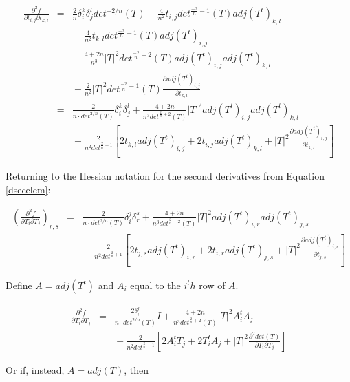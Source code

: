 \documentclass{report}
\begin{document}
\begin{eqnarray}
\nonumber
\frac{\partial^2 f}{\partial t_{i,j} \partial t_{k,l}} & = &
\frac{2}{n} \delta_i^k \delta_j^l det^{-2/n}(T) 
  - \frac{4}{n^2} t_{i,j} det^{\frac{-2}{n}-1}(T) adj(T^t)_{k,l} \\
\nonumber
  & & {} - \frac{4}{n^2}t_{k,l} det^{\frac{-2}{n} - 1}(T) adj(T^t)_{i,j} \\
\nonumber
  & & {} + \frac{4+2n}{n^3} |T|^2 det^{\frac{-2}{n} - 2}(T) adj(T^t)_{i,j} adj(T^t)_{k,l} \\
  & & {} - \frac{2}{n^2} |T|^2 det^{\frac{-2}{n} - 1}(T) \frac{\partial adj(T^t)_{i,j}}{\partial t_{k,l}} \\
 & = & \frac{2}{n \cdot det^{2/n}(T)} \delta_i^k \delta_j^l
     + \frac{4 + 2n}{n^3 det^{\frac{2}{n}+2}(T)} |T|^2 adj(T^t)_{i,j} adj(T^t)_{k,l} \\
\nonumber
& & {} - \frac{2}{n^2 det^{\frac{2}{n}+1}} \left[ 
     2 t_{k,l} adj(T^t)_{i,j} + 2 t_{i,j} adj(T^t)_{k,l}
     + |T|^2 \frac{\partial adj(T^t)_{i,j}}{\partial t_{k,l}} \right] 
\end{eqnarray}

\noindent Returning to the Hessian notation for the second derivatives from Equation \ref{dsecelem}:


\begin{eqnarray}
\left(\frac{\partial^2 f}{\partial T_i \partial T_j}\right)_{r,s} &=&
\frac{2}{n \cdot det^{2/n}(T)} \delta_i^j \delta_r^s
     + \frac{4 + 2n}{n^3 det^{\frac{2}{n}+2}(T)} |T|^2 adj(T^t)_{i,r} adj(T^t)_{j,s} \\
\nonumber
& & {} - \frac{2}{n^2 det^{\frac{2}{n}+1}} \left[ 
     2 t_{j,s} adj(T^t)_{i,r} + 2 t_{i,r} adj(T^t)_{j,s}
     + |T|^2 \frac{\partial adj(T^t)_{i,r}}{\partial t_{j,s}} \right] 
\end{eqnarray}

\noindent Define $A = adj(T^t)$ and $A_i$ equal to the $i^th$ row of $A$.

\begin{eqnarray}
\frac{\partial^2 f}{\partial T_i \partial T_j}
&=& \frac{2 \delta_i^j}{n \cdot det^{2/n}(T)} I
+ \frac{4 + 2n}{n^3 det^{\frac{2}{n}+2}(T)} |T|^2 A_i^t A_j \\ \nonumber
& & {} - \frac{2}{n^2 det^{\frac{2}{n}+1}} \left[ 
2 A_i^t T_j + 2 T_i^t A_j + |T|^2 \frac{\partial^2 det(T)}{\partial T_i \partial T_j} \right]
\end{eqnarray}

\noindent Or if, instead, $A = adj(T)$, then
\end{document}
